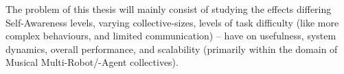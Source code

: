 \documentclass{article}
\begin{document}
The problem of this thesis will mainly consist of studying the effects differing Self-Awareness levels, varying collective-sizes, levels of task difficulty (like more complex behaviours, and limited communication) -- have on usefulness, system dynamics, overall performance, and scalability (primarily within the domain of Musical Multi-Robot/-Agent collectives).




\end{document}
